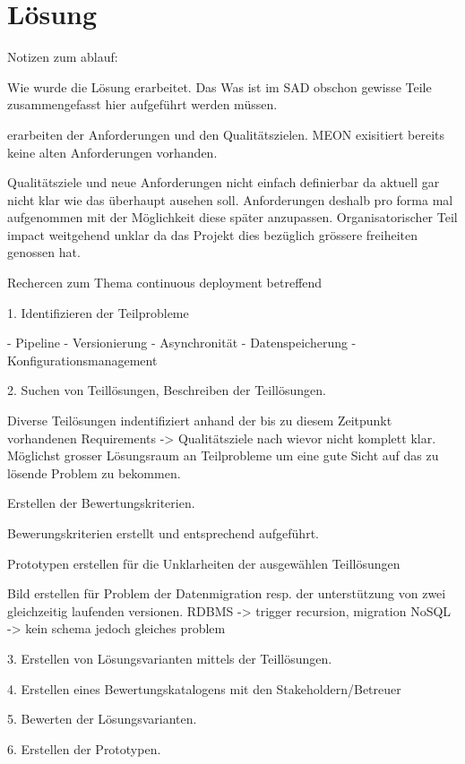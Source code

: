 \chapter{Lösung}

Notizen zum ablauf:

Wie wurde die Lösung erarbeitet. Das Was ist im SAD obschon gewisse Teile zusammengefasst hier aufgeführt werden müssen.

erarbeiten der Anforderungen und den Qualitätszielen. MEON exisitiert bereits keine alten Anforderungen vorhanden. 

Qualitätsziele und neue Anforderungen nicht einfach definierbar da aktuell gar nicht klar wie das überhaupt ausehen soll. Anforderungen deshalb pro forma mal aufgenommen mit der Möglichkeit diese später anzupassen.
Organisatorischer Teil impact weitgehend unklar da das Projekt dies bezüglich grössere freiheiten genossen hat. 

Rechercen zum Thema continuous deployment betreffend

1. Identifizieren der Teilprobleme

- Pipeline
- Versionierung
- Asynchronität
- Datenspeicherung
- Konfigurationsmanagement

2. Suchen von Teillösungen, Beschreiben der Teillösungen.

Diverse Teilösungen indentifiziert anhand der bis zu diesem Zeitpunkt vorhandenen Requirements -> Qualitätsziele nach wievor nicht komplett klar.
Möglichst grosser Lösungsraum an Teilprobleme um eine gute Sicht auf das zu lösende Problem zu bekommen.


Erstellen der Bewertungskriterien.

Bewerungskriterien erstellt und entsprechend aufgeführt.

Prototypen erstellen für die Unklarheiten der ausgewählen Teillösungen

Bild erstellen für Problem der Datenmigration resp. der unterstützung von zwei gleichzeitig laufenden versionen.
RDBMS -> trigger recursion, migration
NoSQL -> kein schema jedoch gleiches problem



3. Erstellen von Lösungsvarianten mittels der Teillösungen.

4. Erstellen eines Bewertungskatalogens mit den Stakeholdern/Betreuer

5. Bewerten der Lösungsvarianten.

6. Erstellen der Prototypen.